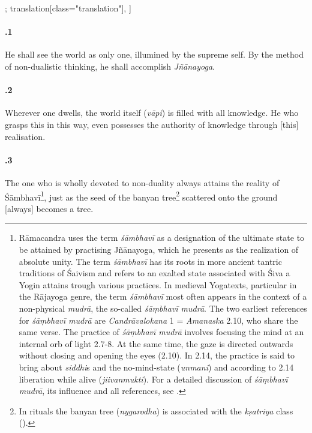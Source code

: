 \begin{alignment}[
  texts=edition[class="edition"];
  translation[class="translation"],
  ]
\begin{translation}
\begin{tlate}[21_1]
       \paragraph{.1} He shall see the world as only one, illumined by the supreme self. By the method of non-dualistic thinking, he shall accomplish \textit{Jñānayoga}.
     \end{tlate}
     \begin{tlate}[21_2]
       \paragraph{.2} Wherever one dwells, the world itself (\textit{vāpi}) is filled with all knowledge. He who grasps this in this way, even possesses the authority of knowledge through [this] realisation. %
     \end{tlate}
     \begin{tlate}[21_3]
       \paragraph{.3} The one who is wholly devoted to non-duality always attains the reality of Śāmbhavī\footnote{Rāmacandra uses the term \textit{śāmbhavī} as a designation of the ultimate state to be attained by practising Jñānayoga, which he presents as the realization of absolute unity. The term \textit{śāmbhavī} has its roots in more ancient tantric traditions of Śaivism and refers to an exalted state associated with Śiva a Yogin attains trough various practices. In medieval Yogatexts, particular in the Rājayoga genre, the term \textit{śāmbhavī} most often appears in the context of a non-physical \textit{mudrā}, the so-called \textit{śāṃbhavī mudrā}. The two earliest references for \textit{śāṃbhavī mudrā} are \textit{Candrāvalokana} 1 = \textit{Amanaska} 2.10, who share the same verse. The practice of \textit{śāṃbhavī mudrā} involves focusing the mind at an internal orb of light  2.7-8. At the same time, the gaze is directed outwards without closing and opening the eyes  (2.10). In  2.14, the practice is said to bring about \textit{siddhi}s and the no-mind-state (\textit{unmani}) and according to  2.14 liberation while alive (\textit{jiivanmukti}). For a detailed discussion of \textit{śāṃbhavī mudrā}, its influence and all references, see \citeauthor[2013:71-79]{birch2013}.}, just as the seed of the banyan tree\footnote{In rituals the banyan tree (\textit{nygarodha}) is associated with the \textit{kṣatriya} class (\citeauthor[1998:27]{smith1998}).} scattered onto the ground [always] becomes a tree.
     \end{tlate}
     \begin{tlate}[21_4]

\end{tlate}
\end{translation}
\end{alignment}
